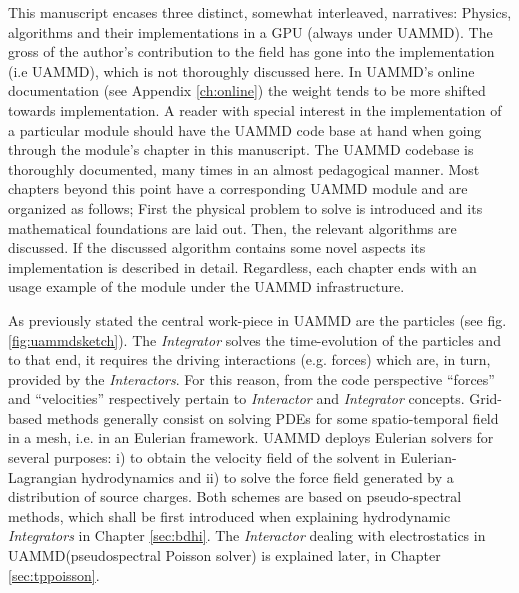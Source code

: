 \documentclass[ twoside,openright,titlepage,numbers=noenddot,%
headinclude,footinclude,cleardoublepage=empty,abstract=on,
BCOR=5mm,paper=a4,fontsize=11pt, dvipsnames
]{scrreprt}
\newcommand{\uammd}{\gls{UAMMD}\xspace}
\begin{document}
This manuscript encases three distinct, somewhat interleaved, narratives: Physics, algorithms and their implementations in a GPU (always under UAMMD).
The gross of the author's contribution to the field has gone into the implementation (i.e UAMMD), which is not thoroughly discussed here. In UAMMD's online documentation (see Appendix \ref{ch:online}) the weight tends to be more shifted towards implementation. A reader with special interest in the implementation of a particular module should have the UAMMD code base at hand when going through the module's chapter in this manuscript. The UAMMD codebase is thoroughly documented, many times in an almost pedagogical manner.
Most chapters beyond this point have a corresponding UAMMD module and are organized as follows; First the physical problem to solve is introduced and its mathematical foundations are laid out. Then, the relevant algorithms are discussed. If the discussed algorithm contains some novel aspects its implementation is described in detail. Regardless, each chapter ends with an usage example of the module under the UAMMD infrastructure.


As previously stated the central work-piece in \uammd are the particles (see fig. \ref{fig:uammdsketch}). The \emph{Integrator} solves the time-evolution of the particles and to that end, it requires the driving interactions (e.g. forces) which are, in turn, provided by the \emph{Interactors}. For this reason, from the code perspective ``forces'' and ``velocities'' respectively pertain to \emph{Interactor} and \emph{Integrator} concepts. Grid-based methods generally consist on solving \glspl{PDE} for some spatio-temporal field in a mesh, i.e. in an Eulerian framework. \uammd deploys Eulerian solvers for several purposes: i) to obtain the velocity field of the solvent in Eulerian-Lagrangian hydrodynamics and ii) to solve the force field generated by a distribution of source charges. Both schemes are based on pseudo-spectral methods, which shall be first introduced when explaining hydrodynamic \emph{Integrators} in Chapter \ref{sec:bdhi}. The \emph{Interactor} dealing with electrostatics in \uammd (pseudospectral Poisson solver) is explained later, in Chapter \ref{sec:tppoisson}.
\end{document}
